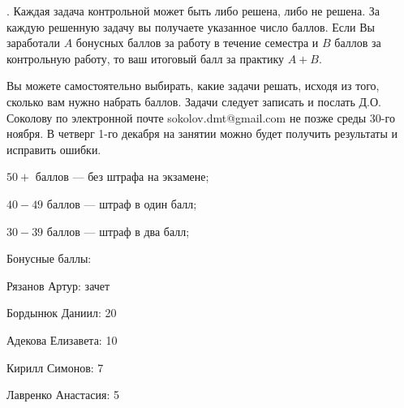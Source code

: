 .
Каждая задача контрольной может быть либо решена, либо не решена. За каждую решенную задачу вы получаете указанное число
баллов. Если Вы заработали $A$ бонусных баллов за работу в течение семестра и $B$ баллов за контрольную работу, то ваш
итоговый балл за практику $A + B$.

Вы можете самостоятельно выбирать, какие задачи решать, исходя из того, сколько вам нужно набрать баллов. Задачи следует
записать и послать Д.О. Соколову по электронной почте sokolov.dmt@gmail.com не позже среды 30-го ноября. В четверг 1-го
декабря на занятии можно будет получить результаты и исправить ошибки.

\begin{enumtask}
    \item $50 +$ баллов --- без штрафа на экзамене;
    \item $40 - 49$ баллов --- штраф в один балл;
    \item $30 - 39$ баллов --- штраф в два балл;
\end{enumtask}

\vspace{0.3cm}

Бонусные баллы:
\begin{enumtask}
    \item Рязанов Артур: зачет
    \item Бордынюк Даниил: 20
    \item Адекова Елизавета: 10
    \item Кирилл Симонов: 7
    \item Лавренко Анастасия: 5
\end{enumtask}

\vspace{0.5cm}